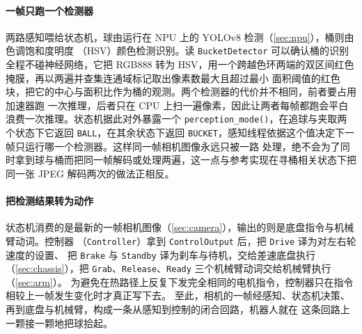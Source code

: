 \paragraph{一帧只跑一个检测器}
两路感知喂给状态机，球由运行在 NPU 上的 YOLOv8 检测（\ref{sec:npu}），桶则由色调饱和度明度
（HSV）颜色检测识别。读 \texttt{BucketDetector} 可以确认桶的识别全程不碰神经网络，它把 RGB888
转为 HSV，用一个跨越色环两端的双区间红色掩膜，再以两遍并查集连通域标记取出像素数最大且超过最小
面积阈值的红色块，把它的中心与面积比作为桶的观测。两个检测器的代价并不相同，前者要占用加速器跑
一次推理，后者只在 CPU 上扫一遍像素，因此让两者每帧都跑会平白浪费一次推理。状态机据此对外暴露一个
\texttt{perception\_mode()}，在追球与夹取两个状态下它返回 \texttt{BALL}，在其余状态下返回
\texttt{BUCKET}，感知线程依据这个值决定下一帧只运行哪一个检测器。这样同一帧相机图像永远只被一路
处理，绝不会为了同时拿到球与桶而把同一帧解码或处理两遍，这一点与参考实现在寻桶相关状态下把同一张
JPEG 解码两次的做法正相反。

\paragraph{把检测结果转为动作}
状态机消费的是最新的一帧相机图像（\ref{sec:camera}），输出的则是底盘指令与机械臂动词。控制器
（\texttt{Controller}）拿到 \texttt{ControlOutput} 后，把 \texttt{Drive} 译为对左右轮速度的设置、
把 \texttt{Brake} 与 \texttt{Standby} 译为刹车与待机，交给差速底盘执行（\ref{sec:chassis}），把
\texttt{Grab}、\texttt{Release}、\texttt{Ready} 三个机械臂动词交给机械臂执行（\ref{sec:arm}）。
为避免在热路径上反复下发完全相同的电机指令，控制器只在指令相较上一帧发生变化时才真正写下去。
至此，相机的一帧经感知、状态机决策、再到底盘与机械臂，构成一条从感知到控制的闭合回路，机器人就在
这条回路上一颗接一颗地把球拾起。

